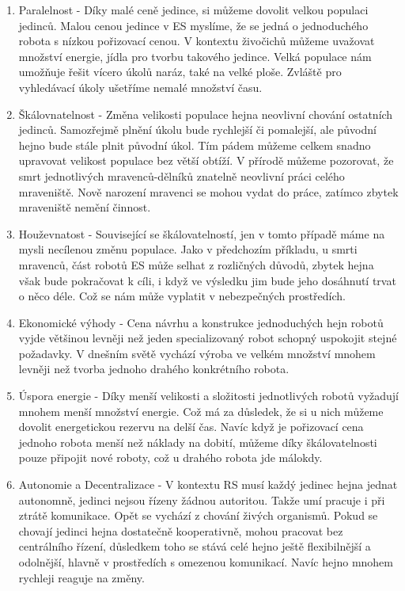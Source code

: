     \begin{enumerate}
        \item Paralelnost - Díky malé ceně jedince, si můžeme dovolit velkou populaci jedinců. Malou cenou jedince v ES myslíme, že se jedná o jednoduchého robota s nízkou pořizovací cenou. V kontextu živočichů můžeme uvažovat množství energie, jídla pro tvorbu takového jedince. Velká populace nám umožňuje řešit vícero úkolů naráz, také na velké ploše. Zvláště pro vyhledávací úkoly ušetříme nemalé množství času. 
        \item Škálovnatelnost - Změna velikosti populace hejna neovlivní chování ostatních jedinců. Samozřejmě plnění úkolu bude rychlejší či pomalejší, ale původní hejno bude stále plnit původní úkol. Tím pádem můžeme celkem snadno upravovat velikost populace bez větší obtíží. V přírodě můžeme pozorovat, že smrt  jednotlivých mravenců-dělníků znatelně neovlivní práci celého mraveniště. Nově narození mravenci se mohou vydat do práce, zatímco zbytek mraveniště nemění činnost. 
        \item Houževnatost - Související se škálovatelností, jen v tomto případě máme na mysli necílenou změnu populace. Jako v předchozím příkladu, u smrti mravenců, část robotů ES může selhat z rozličných důvodů, zbytek hejna však bude pokračovat k cíli, i když ve výsledku jim bude jeho dosáhnutí trvat o něco déle. Což se nám může vyplatit v nebezpečných prostředích. 
        \item Ekonomické výhody - Cena návrhu a konstrukce jednoduchých hejn robotů vyjde většinou levněji než jeden specializovaný robot schopný uspokojit stejné požadavky. V dnešním světě vychází výroba ve velkém množství mnohem levněji než tvorba jednoho drahého konkrétního robota.
        \item Úspora energie - Díky menší velikosti a složitosti jednotlivých robotů vyžadují mnohem menší množství energie. Což má za důsledek, že si u nich můžeme dovolit energetickou rezervu na delší čas. Navíc když je pořizovací cena jednoho robota menší než náklady na dobití, můžeme díky škálovatelnosti pouze připojit nové roboty, což u drahého robota jde málokdy. 
        \item Autonomie a Decentralizace - V kontextu RS musí každý jedinec hejna jednat autonomně, jedinci nejsou řízeny žádnou autoritou. Takže umí pracuje i při ztrátě komunikace. Opět se vychází z chování živých organismů. Pokud se chovají jedinci hejna dostatečně kooperativně, mohou pracovat bez centrálního řízení, důsledkem toho se stává celé hejno ještě flexibilnější a odolnější, hlavně v prostředích s omezenou komunikací. Navíc hejno mnohem rychleji reaguje na změny. 
    \end{enumerate}

